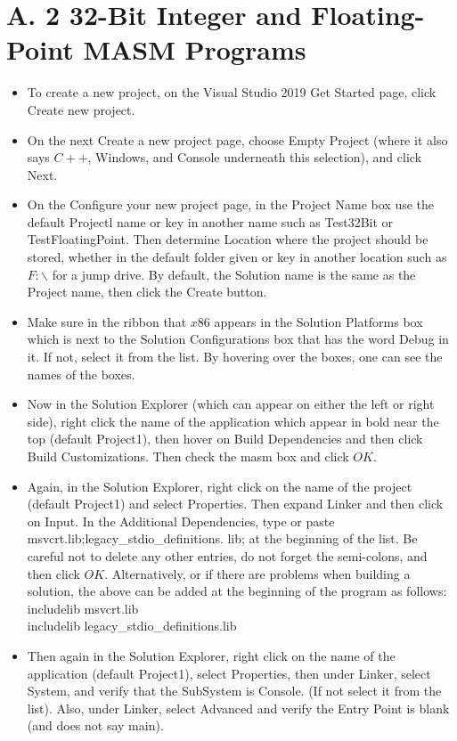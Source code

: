 \documentclass[10pt]{book}
\begin{document}
\section*{A. 2 32-Bit Integer and Floating-Point MASM Programs}
\begin{itemize}
  \item To create a new project, on the Visual Studio 2019 Get Started page, click Create new project.
  \item On the next Create a new project page, choose Empty Project (where it also says $C++$, Windows, and Console underneath this selection), and click Next.
  \item On the Configure your new project page, in the Project Name box use the default Projectl name or key in another name such as Test32Bit or TestFloatingPoint. Then determine Location where the project should be stored, whether in the default folder given or key in another location such as $F: \backslash$ for a jump drive. By default, the Solution name is the same as the Project name, then click the Create button.
  \item Make sure in the ribbon that $x 86$ appears in the Solution Platforms box which is next to the Solution Configurations box that has the word Debug in it. If not, select it from the list. By hovering over the boxes, one can see the names of the boxes.
  \item Now in the Solution Explorer (which can appear on either the left or right side), right click the name of the application which appear in bold near the top (default Project1), then hover on Build Dependencies and then click Build Customizations. Then check the masm box and click $O K$.
  \item Again, in the Solution Explorer, right click on the name of the project (default Project1) and select Properties. Then expand Linker and then click on Input. In the Additional Dependencies, type or paste msvcrt.lib;legacy\_stdio\_definitions. lib; at the beginning of the list. Be careful not to delete any other entries, do not forget the semi-colons, and then click $O K$. Alternatively, or if there are problems when building a solution, the above can be added at the beginning of the program as follows:\\
includelib msvcrt.lib\\
includelib legacy\_stdio\_definitions.lib
  \item Then again in the Solution Explorer, right click on the name of the application (default Project1), select Properties, then under Linker, select System, and verify that the SubSystem is Console. (If not select it from the list). Also, under Linker, select Advanced and verify the Entry Point is blank (and does not say main).

\end{itemize}
\end{document}
